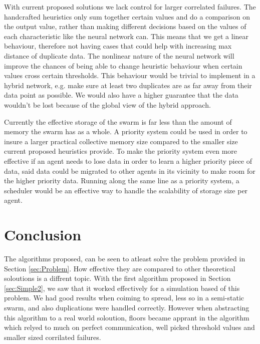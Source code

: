 \documentclass{UoYCSproject}
\begin{document}
With current proposed solutions we lack control for larger correlated failures. 
The handcrafted heuristics only sum together certain values and do a comparison on the output value, rather than making different decisions based on the values of each characteristic like the neural network can. 
This means that we get a linear behaviour, therefore not having cases that could help with increasing max distance of duplicate data. 
The nonlinear nature of the neural network will improve the chances of being able to change heuristic behaviour when certain values cross certain thresholds. 
This behaviour would be trivial to implement in a hybrid network, e.g. make sure at least two duplicates are as far away from their data point as possible. 
We would also have a higher guarantee that the data wouldn’t be lost because of the global view of the hybrid approach.

Currently the effective storage of the swarm is far less than the amount of memory the swarm has as a whole. 
A priority system could be used in order to insure a larger practical collective memory size compared to the smaller size current proposed heuristics provide. 
To make the priority system even more effective if an agent needs to lose data in order to learn a higher priority piece of data, said data could be migrated to other agents in its vicinity to make room for the higher priority data. 
Running along the same line as a priority system, a scheduler would be an effective way to handle the scalability of storage size per agent.


\section{Conclusion}
\label{sec:conc}

The algorithms proposed, can be seen to atleast solve the problem provided in Section \ref{sec:Problem}.
How effective they are compared to other theoretical soloutions is a diffrent topic.
With the first algorithm proposed in Section \ref{sec:Simple2}, we saw that it worked effectively for a simulation based of this problem.
We had good results when coiming to spread, less so in a semi-static swarm, and also duplications were handled correctly.
However when abstracting this algorithm to a real world soloution, floors became apprant in the algorithm which relyed to much on perfect communication, well picked threshold values and smaller sized corrilated failures.
\end{document}
